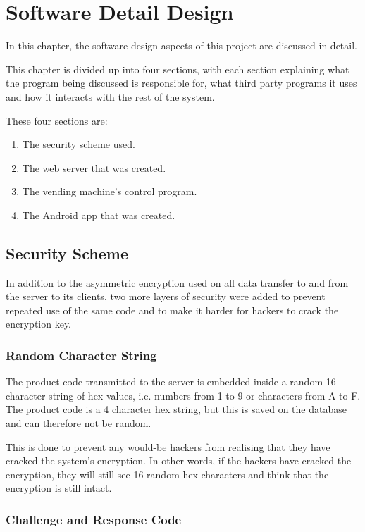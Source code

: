 \chapter{Software Detail Design}

In this chapter, the software design aspects of this project are discussed in
detail.

This chapter is divided up into four sections, with each section explaining what
the program being discussed is responsible for, what third party programs it
uses and how it interacts with the rest of the system. 

These four sections are:

\begin{enumerate}
  \item The security scheme used.
  \item The web server that was created.
  \item The vending machine's control program.
  \item The Android app that was created.
\end{enumerate}

\section{Security Scheme}
\label{sec:security-code-scheme}

In addition to the asymmetric encryption used on all data transfer to and from
the server to its clients, two more layers of security were added to prevent
repeated use of the same code and to make it harder for hackers to crack the
encryption key.

\subsection{Random Character String}

The product code transmitted to the server is embedded inside a
random 16-character string of hex values, i.e. numbers from 1 to 9 or characters
from A to F. The product code is a 4 character hex string, but this is saved on
the database and can therefore not be random. 

This is done to prevent any would-be
hackers from realising that they have cracked the system's encryption. In other
words, if the hackers have cracked the encryption, they will still see 16
random hex characters and think that the encryption is still intact.

\subsection{Challenge and Response Code}

